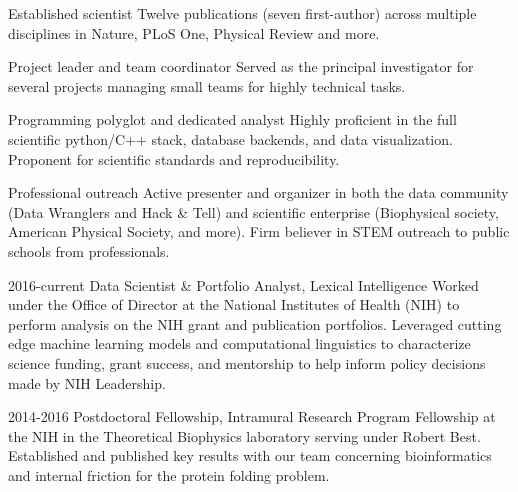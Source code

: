 \documentclass[]{scrartcl}
\begin{document}
\begin{cleanCV}

\vspace{-1em}


\Highlight
{Established scientist}
{Twelve publications (seven first-author) across multiple disciplines in Nature, PLoS One, Physical Review and more.}

\Highlight
{Project leader and team coordinator}
{Served as the principal investigator for several projects managing small teams for highly technical tasks.}

\Highlight
{Programming polyglot and dedicated analyst}
{Highly proficient in the full scientific python/C++ stack, database backends, and data visualization. 
Proponent for scientific standards and reproducibility.}

\Highlight
{Professional outreach}
{Active presenter and organizer in both the data community (Data Wranglers and Hack \& Tell) and scientific enterprise (Biophysical society, American Physical Society, and more). Firm believer in STEM outreach to public schools from professionals.}






\WorkExperience
{2016-current}
{Data Scientist \& Portfolio Analyst, Lexical Intelligence}
{
  Worked under the Office of Director at the National Institutes of Health (NIH) to perform analysis on the NIH grant and publication portfolios. Leveraged cutting edge machine learning models and computational linguistics to characterize science funding, grant success, and mentorship to help inform policy decisions made by NIH Leadership.
}

\WorkExperience
{2014-2016}
{Postdoctoral Fellowship, Intramural Research Program}
{%
Fellowship at the NIH in the Theoretical Biophysics laboratory serving under Robert Best.
Established and published key results with our team concerning bioinformatics and internal friction for the protein folding problem.}


\end{cleanCV}
\end{document}
